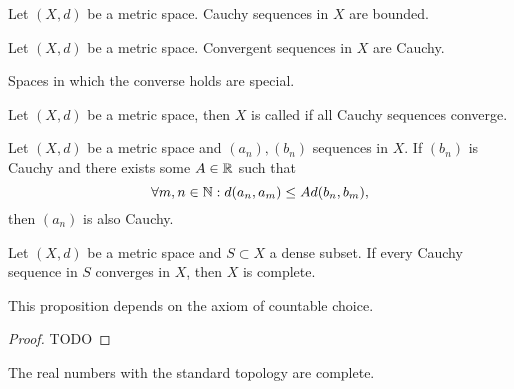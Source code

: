 \begin{lemma}
Let $(X,d)$ be a metric space. Cauchy sequences in $X$ are bounded.
\end{lemma}

\begin{proposition}
Let $(X,d)$ be a metric space. Convergent sequences in $X$ are Cauchy.
\end{proposition}
Spaces in which the converse holds are special.
\begin{definition}
Let $(X,d)$ be a metric space, then $X$ is called  if all Cauchy sequences converge.
\end{definition}

\begin{proposition} \label{CauchyCriterion}
Let $(X,d)$ be a metric space and $(a_n), (b_n)$ sequences in $X$. If $(b_n)$ is Cauchy and there exists some $A\in\mathbb{R}$ such that
\[ \forall m,n\in\mathbb{N}: d(a_n,a_m) \leq A d(b_n,b_m), \]
then $(a_n)$ is also Cauchy.
\end{proposition}

\begin{proposition} \label{completenessCriterion}
Let $(X,d)$ be a metric space and $S\subset X$ a dense subset. If every Cauchy sequence in $S$ converges in $X$, then $X$ is complete.
\end{proposition}
This proposition depends on the axiom of countable choice.
\begin{proof}
TODO
\end{proof}

\begin{lemma}
The real numbers with the standard topology are complete.
\end{lemma}

